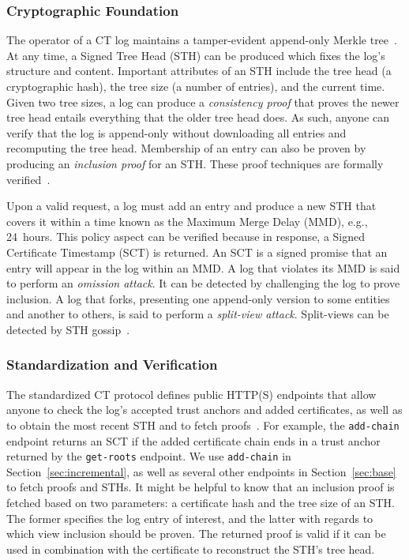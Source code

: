 \subsubsection{Cryptographic Foundation}
The operator of a CT log maintains a tamper-evident append-only Merkle
tree~\cite{ct,ct/bis}.  At any time, a Signed Tree Head (STH) can be produced
which fixes the log's structure and content.  Important attributes of an STH
include
	the tree head (a cryptographic hash),
	the tree size (a number of entries), and
	the current time.
Given two tree sizes, a log can produce a \emph{consistency proof} that proves
the newer tree head entails everything that the older tree head does.  As such,
anyone can verify that the log is append-only without downloading all entries
and recomputing the tree head.  Membership of an entry can also be proven
by producing an \emph{inclusion proof} for an STH.  These proof techniques are
formally verified~\cite{secure-logging-and-ct}.

Upon a valid request, a log must add an entry and produce a new STH that covers
it within a time known as the Maximum Merge Delay (MMD), e.g., 24~hours.  This
policy aspect can be verified because in response, a Signed Certificate
Timestamp (SCT) is returned.  An SCT is a signed promise that an entry will
appear in the log within an MMD.  A log that violates its MMD is said to perform
an \emph{omission attack}.  It can be detected by challenging the log to prove
inclusion.  A log that forks, presenting one append-only version
to some entities and another to others, is said to perform a \emph{split-view
attack}.  Split-views can be detected by STH
gossip~\cite{chuat,dahlberg,nordberg,syta}.

\subsubsection{Standardization and Verification}
The standardized CT protocol defines public HTTP(S) endpoints that allow anyone
to check the log's accepted trust anchors and added certificates, as well as
to obtain the most recent STH and to fetch proofs~\cite{ct,ct/bis}.  For
example, the \texttt{add-chain} endpoint returns an SCT if the added certificate
chain ends in a trust anchor returned by the \texttt{get-roots} endpoint.  We
use \texttt{add-chain} in Section~\ref{sec:incremental}, as well as several
other endpoints in Section~\ref{sec:base} to fetch proofs and STHs.  It might be
helpful to know that an inclusion proof is fetched based on two parameters: a
certificate hash and the tree size of an STH.  The former specifies the log entry
of interest, and the latter with regards to which view inclusion should be
proven.  The returned proof is valid if it can be used in combination with the
certificate to reconstruct the STH's tree head.

